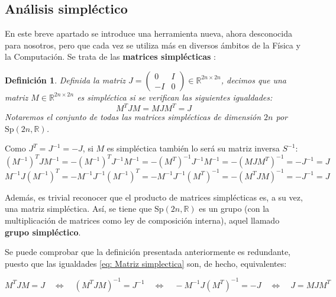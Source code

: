 \documentclass[11pt,a4paper,twoside,pdf]{article}
\numberwithin{equation}{section}
\newtheorem{definition}{Definición}
\begin{document}
	\subsection{Análisis simpléctico}
				
		En este breve apartado se introduce una herramienta nueva, ahora desconocida para nosotros, pero que cada vez se utiliza más en diversos ámbitos de la Física y la Computación. Se trata de las \textbf{matrices simplécticas} \cite{deGosson}:

			\begin{definition}\label{def: Matriz simplectica}
			Definida la matriz $J = \left(\begin{array}{cc}0 & I\\-I & 0\end{array}\right) \in \mathbb{R}^{2n\times 2n}$,  decimos que una matriz $M \in \mathbb{R}^{2n\times 2n}$ es simpléctica si se verifican las siguientes igualdades:
					\begin{equation} \label{eq: Matriz simplectica}
								M^T J M =  M J M^T = J
					\end{equation}
			Notaremos el conjunto de todas las matrices simplécticas de dimensión $2n$ por $\text{Sp}(2n,\mathbb{R})$.    
			\end{definition}

		\noindent Como $J^T=J^{-1}=-J$, si $M$ es simpléctica también lo será su matriz inversa $S^{-1}$:
			\begin{equation*}
				(M^{-1})^T J M^{-1} = - (M^{-1})^T J^{-1} M^{-1} = -(M^T)^{-1}J^{-1}M^{-1} = -(MJM^T)^{-1} = -J^{-1} =J
			\end{equation*}
			\begin{equation*}	
				M^{-1} J (M^{-1})^T = - M^{-1} J^{-1} (M^{-1})^T = -M^{-1}J^{-1}(M^T)^{-1}= -(M^TJM)^{-1} = -J^{-1} =J
			\end{equation*}

		\noindent Además, es trivial reconocer que el producto de matrices simplécticas es, a su vez, una matriz simpléctica. Así, se tiene que $\text{Sp}(2n, \mathbb{R})$ es un grupo (con la multiplicación de matrices como ley de composición interna), aquel llamado \textbf{grupo simpléctico}.    

		\noindent Se puede comprobar que la definición presentada anteriormente es redundante, puesto que las igualdades \ref{eq: Matriz simplectica} son, de hecho, equivalentes:
		
			\begin{center}
				$M^TJM=J \quad \Leftrightarrow \quad (M^TJM)^{-1} = J^{-1}  \quad  \Leftrightarrow \quad
					-M^{-1}J(M^T)^{-1} = -J \quad \Leftrightarrow \quad  J = MJM^T $
			\end{center}
\end{document}
